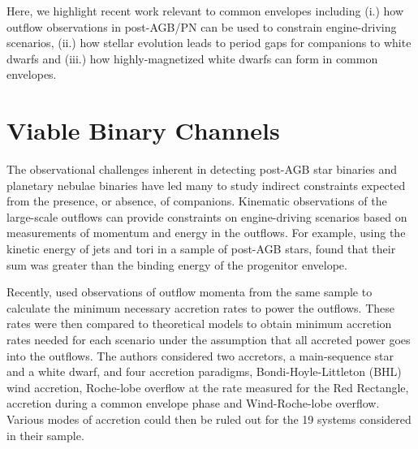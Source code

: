 \documentclass{iau_FM}
\begin{document}
Here, we highlight recent work relevant to common envelopes including (i.) how outflow observations in post-AGB/PN can be used to constrain engine-driving scenarios, (ii.) how stellar evolution leads to period gaps for companions to white dwarfs and (iii.) how highly-magnetized white dwarfs can form in common envelopes.


\section{Viable Binary Channels}
The observational challenges inherent in detecting post-AGB star binaries and planetary nebulae binaries have led many to study indirect constraints expected from the presence, or absence, of companions.  Kinematic observations of the large-scale outflows can provide constraints on engine-driving scenarios based on measurements of momentum and energy in the outflows.  For example, using the kinetic energy of jets and tori in a sample of post-AGB stars, \cite{2012IAUS..283..188H} found that their sum was greater than the binding energy of the progenitor envelope.

Recently, \cite{BL2014} used observations of outflow momenta from the same sample to calculate the minimum necessary accretion rates to power the outflows.  These rates were then compared to theoretical models to obtain minimum accretion rates needed for each scenario under the assumption that all accreted power goes into the outflows.  The authors considered two accretors, a main-sequence star and a white dwarf, and four accretion paradigms, Bondi-Hoyle-Littleton (BHL) wind accretion, Roche-lobe overflow at the rate measured for the Red Rectangle, accretion during a common envelope phase and Wind-Roche-lobe overflow.  Various modes of accretion could then be ruled out for the 19 systems considered in their sample.  
\end{document}
